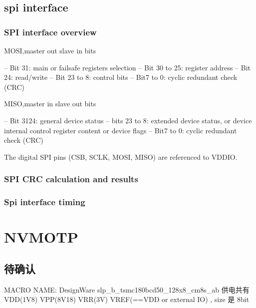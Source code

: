 \documentclass[letterpaper,10pt,english]{sphinxmanual}
\begin{document}
\section{spi interface}
\label{\detokenize{device:spi-interface}}

\subsection{SPI interface overview}
\label{\detokenize{device:spi-interface-overview}}
\sphinxAtStartPar
MOSI,master out slave in bits

\noindent{}

\sphinxAtStartPar
– Bit 31: main or fail\sphinxhyphen{}safe registers selection
– Bit 30 to 25: register address
– Bit 24: read/write
– Bit 23 to 8: control bits
– Bit7 to 0: cyclic redundant check (CRC)

\sphinxAtStartPar
MISO,master in slave out bits

\noindent{}

\sphinxAtStartPar
– Bit 31\sphinxhyphen{}24: general device status
– bits 23 to 8: extended device status, or device internal control register content or
device flags
– Bit7 to 0: cyclic redundant check (CRC)

\sphinxAtStartPar
The digital SPI pins (CSB, SCLK, MOSI, MISO) are referenced to VDDIO.


\subsection{SPI CRC calculation and results}
\label{\detokenize{device:spi-crc-calculation-and-results}}

\subsection{Spi interface timing}
\label{\detokenize{device:spi-interface-timing}}
\sphinxstepscope


\chapter{NVM\sphinxhyphen{}OTP}
\label{\detokenize{otp:nvm-otp}}\label{\detokenize{otp::doc}}

\section{待确认}
\label{\detokenize{otp:id1}}
\sphinxAtStartPar
MACRO NAME: DesignWare slp\_b\_tsmc180bcd50\_128x8\_cm8s\_ab 供电共有 VDD(1V8) VPP(8V18) VRR(3V) VREF(==VDD or external IO) , size 是 8bit
\end{document}
